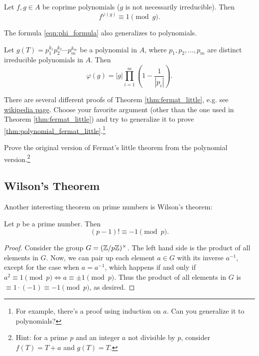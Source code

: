 \begin{theorem}
    \label{thm:polynomial_euler}
    Let $f, g \in A$ be coprime polynomials ($g$ is not necessarily irreducible).
    Then
    \[
        f^{\varphi(g)} \equiv 1 \pmod{g}.
    \]
\end{theorem}

The formula \eqref{eqn:phi_formula} also generalizes to polynomials.
\begin{theorem}
    \label{thm:polynomial_phi_prime_power}
    Let $g(T) = p_1^{k_1} p_2^{k_2} \cdots p_m^{k_m}$ be a polynomial in $A$, where $p_1, p_2, \ldots, p_m$ are distinct irreducible polynomials in $A$.
    Then
    \[
        \varphi(g) = |g| \prod_{i=1}^m \left(1 - \frac{1}{|p_i|}\right).
    \]
\end{theorem}

\begin{exercise}
    There are several different proofs of Theorem \ref{thm:fermat_little}, e.g. see \href{https://en.wikipedia.org/wiki/Proofs_of_Fermat%27s_little_theorem}{wikipedia page}.
    Choose your favorite argument (other than the one used in Theorem \ref{thm:fermat_little}) and try to generalize it to prove \ref{thm:polynomial_fermat_little}.\footnote{For example, there's a proof using induction on $a$. Can you generalize it to polynomials?}
\end{exercise}

\begin{exercise}
    Prove the original version of Fermat's little theorem from the polynomial version.\footnote{Hint: for a prime $p$ and an integer $a$ not divisible by $p$, consider $f(T) = T + a$ and $g(T) = T$.}
\end{exercise}



\subsection{Wilson's Theorem}
\label{subsec:basicnt_wilson}

Another interesting theorem on prime numbers is Wilson's theorem:
\begin{theorem}
    Let $p$ be a prime number. Then
    \[
        (p - 1)! \equiv -1 \pmod{p}.
    \]
\end{theorem}
\begin{proof}
    Consider the group $G = (\mathbb{Z} / p\mathbb{Z})^\times$.
    The left hand side is the product of all elements in $G$.
    Now, we can pair up each element $a \in G$ with its inverse $a^{-1}$, except for the case when $a = a^{-1}$, which happens if and only if $a^2 \equiv 1 \pmod{p} \Leftrightarrow a \equiv \pm 1 \pmod{p}$.
    Thus the product of all elements in $G$ is $\equiv 1 \cdot (-1) \equiv -1 \pmod{p}$, as desired.
\end{proof}

